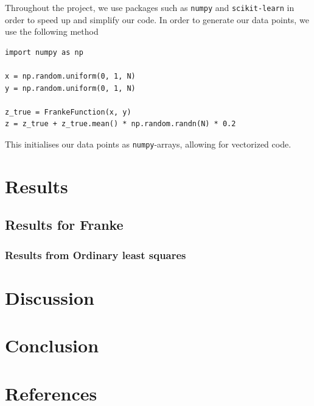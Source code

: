 \documentclass{article}
\begin{document}
Throughout the project, we use packages such as \texttt{numpy} and \texttt{scikit-learn} in order to speed up and simplify our code. In order to generate our data points, we use the following method
\begin{verbatim}
import numpy as np

x = np.random.uniform(0, 1, N)
y = np.random.uniform(0, 1, N)

z_true = FrankeFunction(x, y)
z = z_true + z_true.mean() * np.random.randn(N) * 0.2
\end{verbatim}
This initialises our data points as \texttt{numpy}-arrays, allowing for vectorized code.



\section{Results}
\subsection{Results for Franke}
\subsubsection{Results from Ordinary least squares}


\section{Discussion}

\section{Conclusion}

\section{References}

\end{document}
